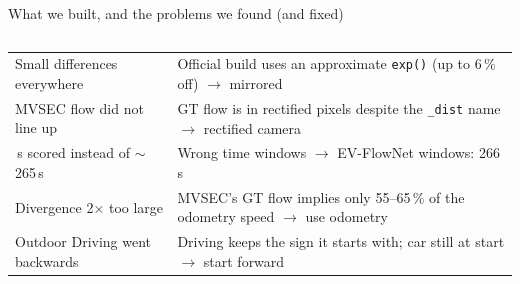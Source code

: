 \documentclass[aspectratio=169,10pt]{beamer}
\begin{document}
\begin{frame}{What we built, and the problems we found (and fixed)}
\begin{columns}[T,onlytextwidth]
\begin{tabular}{@{}>{\raggedright\arraybackslash}p{2.45cm}>{\raggedright\arraybackslash}p{5.45cm}@{}}
      Small differences everywhere & Official build uses an \alert{approximate \texttt{exp()}} (up to 6\,\% off) $\rightarrow$ mirrored \\
      MVSEC flow did not line up & GT flow is in \alert{rectified} pixels despite the \texttt{\_dist} name $\rightarrow$ rectified camera \\
      463\,s scored instead of $\sim$265\,s & Wrong time windows $\rightarrow$ EV-FlowNet windows: 266\,s \\
      Divergence 2$\times$ too large & \leavevmode\alert{MVSEC's GT flow implies only 55--65\,\%} of the odometry speed $\rightarrow$ use odometry \\
      Outdoor Driving went backwards & Driving keeps the sign it starts with; car still at start $\rightarrow$ start forward \\
      \bottomrule
    \end{tabular}
  \end{columns}
\end{frame}
\end{document}
